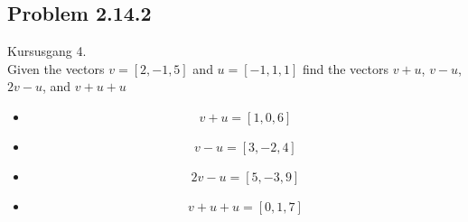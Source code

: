 \subsection{Problem 2.14.2}
Kursusgang 4.\\
Given the vectors $v=[2,-1,5]$ and $u=[-1,1,1]$ find the vectors $v+u$, $v-u$, $2v-u$, and $v+u+u$
\begin{itemize}
    \item \begin{equation}
        v+u=[1,0,6]
    \end{equation}
    \item \begin{equation}
        v-u=[3,-2,4]
    \end{equation}
    \item \begin{equation}
        2v-u=[5,-3, 9]
    \end{equation}
    \item \begin{equation}
        v+u+u=[0,1,7]
    \end{equation}
\end{itemize}